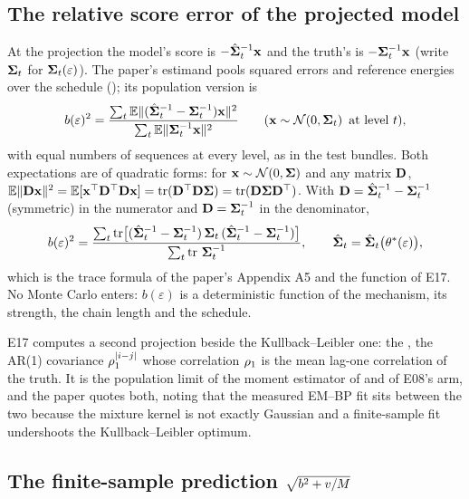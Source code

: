 \subsection{The relative score error of the projected model}

At the projection the model's score is $-\hat{\mathbf{\Sigma}}_t^{-1}\mathbf{x}$ and the truth's is
$-\mathbf{\Sigma}_t^{-1}\mathbf{x}$ (write $\mathbf{\Sigma}_t$ for $\mathbf{\Sigma}_t(\varepsilon)$). The paper's estimand pools
squared errors and reference energies over the schedule
(); its population version is
\begin{equation}
  b(\varepsilon)^2=\frac{\sum_t\mathbb{E}\lVert(\hat{\mathbf{\Sigma}}_t^{-1}-\mathbf{\Sigma}_t^{-1})\mathbf{x}\rVert^2}{\sum_t\mathbb{E}\lVert\mathbf{\Sigma}_t^{-1}\mathbf{x}\rVert^2}
  \qquad(\mathbf{x}\sim\mathcal{N}\!\left(0,\mathbf{\Sigma}_t\right)\text{ at level }t),
\end{equation}
with equal numbers of sequences at every level, as in the test bundles. Both
expectations are of quadratic forms: for $\mathbf{x}\sim\mathcal{N}\!\left(0,\mathbf{\Sigma}\right)$ and any matrix $\mathbf{D}$,
$\mathbb{E}\lVert\mathbf{D}\mathbf{x}\rVert^2=\mathbb{E}[\mathbf{x}^\top\mathbf{D}^\top\mathbf{D}\mathbf{x}]=\operatorname{tr}(\mathbf{D}^\top\mathbf{D}\mathbf{\Sigma})=\operatorname{tr}(\mathbf{D}\mathbf{\Sigma}\mathbf{D}^\top)$.
With $\mathbf{D}=\hat{\mathbf{\Sigma}}_t^{-1}-\mathbf{\Sigma}_t^{-1}$ (symmetric) in the numerator and
$\mathbf{D}=\mathbf{\Sigma}_t^{-1}$ in the denominator,
\begin{equation}
  b(\varepsilon)^2=\frac{\sum_t\operatorname{tr}\bigl[(\hat{\mathbf{\Sigma}}_t^{-1}-\mathbf{\Sigma}_t^{-1})\,\mathbf{\Sigma}_t\,(\hat{\mathbf{\Sigma}}_t^{-1}-\mathbf{\Sigma}_t^{-1})\bigr]}{\sum_t\operatorname{tr}\,\mathbf{\Sigma}_t^{-1}},
  \qquad\hat{\mathbf{\Sigma}}_t=\hat{\mathbf{\Sigma}}_t\bigl(\theta^\ast(\varepsilon)\bigr),
  \label{eq:bias}
\end{equation}
which is the trace formula of the paper's Appendix A5 and the function
 of E17. No Monte Carlo enters: $b(\varepsilon)$ is a deterministic
function of the mechanism, its strength, the chain length and the schedule.

E17 computes a second projection beside the Kullback--Leibler one: the , the AR(1) covariance $\rho_1^{|i-j|}$ whose correlation $\rho_1$ is the mean
lag-one correlation of the truth. It is the population limit of the moment estimator of
 and of E08's  arm, and the paper
quotes both, noting that the measured EM--BP fit sits between the two because the
mixture kernel is not exactly Gaussian and a finite-sample fit undershoots the
Kullback--Leibler optimum.

\subsection{The finite-sample prediction \texorpdfstring{$\sqrt{b^2+v/M}$}{sqrt(b2 + v/M)}}

